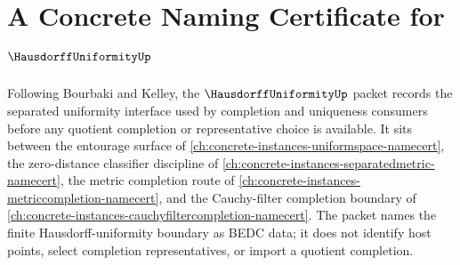 \chapter{A Concrete Naming Certificate for $\HausdorffUniformityUp$}
\label{ch:concrete-instances-hausdorff-uniformity-namecert}

Following Bourbaki and Kelley, the $\HausdorffUniformityUp$ packet records the separated uniformity interface used by completion and uniqueness consumers before any quotient completion or representative choice is available. It sits between the entourage surface of \autoref{ch:concrete-instances-uniformspace-namecert}, the zero-distance classifier discipline of \autoref{ch:concrete-instances-separatedmetric-namecert}, the metric completion route of \autoref{ch:concrete-instances-metriccompletion-namecert}, and the Cauchy-filter completion boundary of \autoref{ch:concrete-instances-cauchyfiltercompletion-namecert}. The packet names the finite Hausdorff-uniformity boundary as BEDC data; it does not identify host points, select completion representatives, or import a quotient completion.

